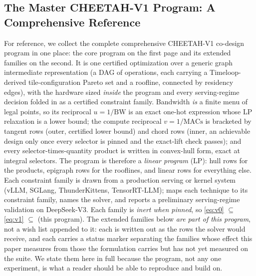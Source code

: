 \begin{landscape}
\section{The Master CHEETAH-V1 Program: A Comprehensive Reference}
\label{app:master_v3}

For reference, we collect the complete comprehensive CHEETAH-V1 co-design program
in one place: the core program on the first page and its extended families on the
second. It is one certified optimization over a generic graph
intermediate representation (a DAG of operations, each carrying a Timeloop-derived
tile-configuration Pareto set and a roofline, connected by residency edges), with
the hardware sized \emph{inside} the program and every serving-regime decision folded
in as a certified constraint family. Bandwidth \emph{is} a finite menu of legal
points, so its reciprocal $u=1/\mathrm{BW}$ is an exact one-hot expression
whose LP relaxation is a lower bound; the compute reciprocal $v=1/\mathrm{MACs}$
is bracketed by tangent rows (outer, certified lower bound) and chord rows
(inner, an achievable design only once every selector is pinned and the
exact-lift check passes); and every selector-times-quantity product is written
in convex-hull form, exact at integral selectors. The program is therefore a
\emph{linear program} (LP): hull rows for the products, epigraph rows for the
rooflines, and linear rows for everything else. Each constraint family is drawn
from a production serving or kernel system (vLLM, SGLang, ThunderKittens,
TensorRT-LLM);  maps each technique to its constraint
family, names the solver, and reports a preliminary serving-regime validation on
DeepSeek-V3. Each family is \emph{inert when pinned}, so
\eqref{eq:v0} $\subseteq$ \eqref{eq:v1} $\subseteq$ (this program).
The extended families below \emph{are part of this program}, not a wish list
appended to it: each is written out as the rows the solver would receive, and
each carries a status marker separating the families whose effect this paper
measures from those the formulation carries but has not yet measured on the
suite. We state them here in full because the program, not any one experiment,
is what a reader should be able to reproduce and build on.


\end{landscape}
